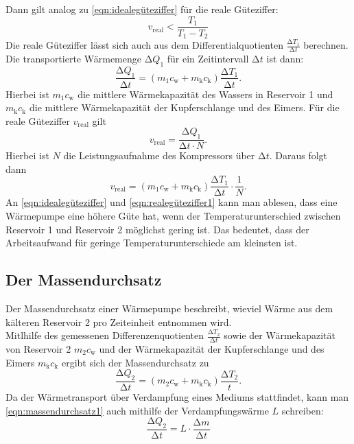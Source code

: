 \documentclass{scrartcl} %
\begin{document}
	Dann gilt analog zu \eqref{eqn:idealegüteziffer} für die reale Güteziffer:
	\begin{equation}
		v_\text{real} < \frac{T_\text{1}}{T_\text{1}-T_\text{2}}
		\label{eqn:realegüteziffer1}
	\end{equation}
  Die reale Güteziffer lässt sich auch aus dem Differentialquotienten $ \frac{\increment T_\text{1}}{\increment t}$ berechnen. Die transportierte Wärmemenge $\increment Q_\text{1}$
  für ein Zeitintervall $\increment t$ ist dann:
  \begin{equation}
    \frac{\increment Q_\text{1}}{\increment t} = (m_\text{1}c_\text{w} + m_\text{k}c_\text{k}) \frac{\increment T_\text{1}}{\increment t}.
    \label{eqn:realegüteziffer2}
  \end{equation}
  Hierbei ist $m_\text{1}c_\text{w}$ die mittlere Wärmekapazität des Wassers in Reservoir 1 und $m_\text{k}c_\text{k}$ die mittlere Wärmekapazität der Kupferschlange und des Eimers.
  Für die reale Güteziffer $v_\text{real}$ gilt
  \begin{equation}
    v_\text{real} = \frac{\increment Q_\text{1}}{\increment t \cdot N}.
  \end{equation}
  Hierbei ist $N$ die Leistungsaufnahme des Kompressors über $\increment t$. Daraus folgt dann
  \begin{equation}
    v_\text{real} = (m_\text{1}c_\text{w} + m_\text{k}c_\text{k}) \frac{\increment T_\text{1}}{\increment t} \cdot \frac{1}{N}.
    \label{eqn:realegüteziffer3}
  \end{equation}
	An \eqref{eqn:idealegüteziffer} und \eqref{eqn:realegüteziffer1} kann man ablesen, dass eine Wärmepumpe eine höhere Güte hat,
	wenn der Temperaturunterschied zwischen Reservoir 1 und Reservoir 2 möglichst gering ist. Das bedeutet, dass der Arbeitsaufwand
	für geringe Temperaturunterschiede am kleinsten ist.
	\subsection{Der Massendurchsatz}
	Der Massendurchsatz einer Wärmepumpe beschreibt, wieviel Wärme aus dem kälteren Reservoir 2 pro Zeiteinheit entnommen wird. \\
	Mitlhilfe des gemessenen Differenzenquotienten $ \frac{\increment T_\text{2}}{\increment t}$ sowie der Wärmekapazität von Reservoir 2
	$m_\text{2}c_\text{w}$ und der Wärmekapazität der Kupferschlange und des Eimers $m_\text{k}c_\text{k}$ ergibt sich der Massendurchsatz
	zu
	\begin{equation}
		\frac{\increment Q_\text{2}}{\increment t} = (m_\text{2} c_\text{w} + m_\text{k} c_\text{k}) \frac{\increment T_\text{2}}{t}.
		\label{eqn:massendurchsatz1}
	\end{equation}
	Da der Wärmetransport über Verdampfung eines Mediums stattfindet, kann man \eqref{eqn:massendurchsatz1} auch mithilfe der
	Verdampfungswärme $L$ schreiben:
	\begin{equation}
		\frac{\increment Q_\text{2}}{\increment t} = L \cdot \frac{\increment m}{\increment t}
		\label{eqn:massendurchsatz2}
	\end{equation}
\end{document}
